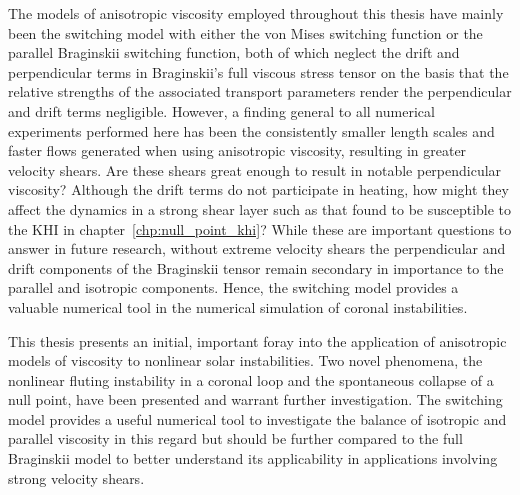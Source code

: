 The models of anisotropic viscosity employed throughout this thesis have mainly been the switching model with either the von Mises switching function or the parallel Braginskii switching function, both of which neglect the drift and perpendicular terms in Braginskii's full viscous stress tensor on the basis that the relative strengths of the associated transport parameters render the perpendicular and drift terms negligible. However, a finding general to all numerical experiments performed here has been the consistently smaller length scales and faster flows generated when using anisotropic viscosity, resulting in greater velocity shears. Are these shears great enough to result in notable perpendicular viscosity? Although the drift terms do not participate in heating, how might they affect the dynamics in a strong shear layer such as that found to be susceptible to the KHI in chapter~\ref{chp:null_point_khi}? While these are important questions to answer in future research, without extreme velocity shears the perpendicular and drift components of the Braginskii tensor remain secondary in importance to the parallel and isotropic components. Hence, the switching model provides a valuable numerical tool in the numerical simulation of coronal instabilities.

This thesis presents an initial, important foray into the application of anisotropic models of viscosity to nonlinear solar instabilities. Two novel phenomena, the nonlinear fluting instability in a coronal loop and the spontaneous collapse of a null point, have been presented and warrant further investigation. The switching model provides a useful numerical tool to investigate the balance of isotropic and parallel viscosity in this regard but should be further compared to the full Braginskii model to better understand its applicability in applications involving strong velocity shears.


